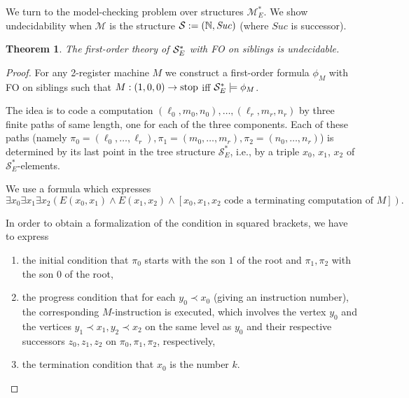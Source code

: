 \documentclass[copyright,creativecommons]{eptcs}
\newtheorem{theorem}{Theorem}
\theoremstyle{plain}
\theoremstyle{nonumberplain}
\newtheorem{proof}{Proof}
\newcommand{\m}{\ensuremath{\mathcal{M}}}
\newcommand{\MstrongE}{\ensuremath{\m^*_E}}
\newcommand{\Suc}{\ensuremath{\mathit{Suc}}}
\begin{document}
We turn to the model-checking problem over structures $\MstrongE$. We show 
undecidability when 
$\m$ is the structure ${\cal S} := (\mathbb{N}, \Suc)$ (where $\Suc$ is successor). 

\begin{theorem}
The first-order theory of ${\cal S}_E^*$ with FO on siblings is undecidable. 
\end{theorem}

\begin{proof}
For any 2-register machine $M$ we construct a first-order formula 
$\phi_M$ with FO on siblings such that $M : (1,0,0) \rightarrow {\rm stop}$ 
iff ${\cal S}_E^* \models \phi_M$. 

The idea is to code a computation $(\ell_0, m_0, n_0), \ldots, 
(\ell_r, m_r, n_r)$
by three finite paths of same length, one for each of the 
three components. Each of these paths (namely $\pi_0 = (\ell_0, \ldots, \ell_r), 
\pi_1 = (m_0, \ldots, m_r), \pi_2 = (n_0, \ldots, n_r)$) is determined by its 
last point in the tree structure $\mathcal{S}_E^*$, i.e., by a triple $x_0$, $x_1$, $x_2$ of $\mathcal{S}_E^*$-elements.

We use a formula which expresses
$$\exists x_0 \exists x_1 \exists x_2 (E(x_0, x_1) \wedge E(x_1, x_2) \wedge [x_0, x_1, x_2
\mbox{ code a terminating computation of } M]).$$  

In order to obtain a formalization of the condition in squared brackets, we have to express 
\begin{enumerate}
\item 
the initial condition that $\pi_0$ starts with the son $1$ of the root 
and $\pi_1, \pi_2$ with the son $0$ of the root, 
\item
the progress condition that for each $y_0 \prec x_0$ (giving an instruction number), the corresponding 
$M$-instruction is executed, which involves the vertex $y_0$ and the vertices $y_1 \prec x_1,
y_2 \prec x_2$ on the same level as $y_0$ and their respective successors $z_0, z_1, z_2$ 
on $\pi_0, \pi_1, \pi_2$, respectively, 
\item 
the termination condition that $x_0$ is the number $k$.
\end{enumerate}


\end{proof}
\end{document}
